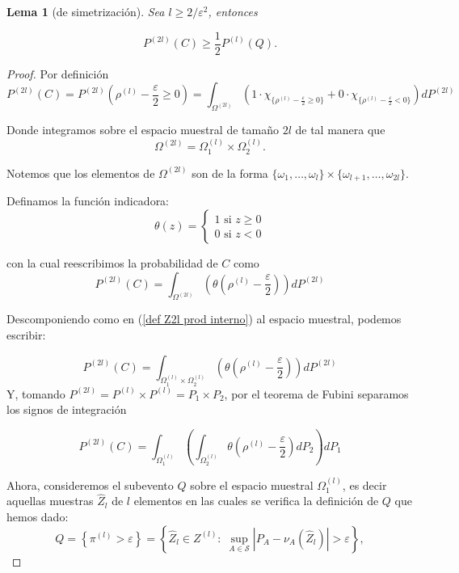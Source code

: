 \documentclass{report}
\newtheorem{lem}{Lema}[section]
\begin{document}
\begin{lem} [de simetrización]
    Sea \( l \geq 2 / \varepsilon^2 \), entonces

    \[
    P^{(2l)}(C) \geq \frac{1}{2} P^{(l)}(Q).
    \]
\end{lem}
\begin{proof}
Por definición
\begin{equation*}
P^{(2l)}(C) = P^{(2l)}\left(\rho^{(l)}-\frac{\varepsilon}{2}\geq 0\right) = \int_{\Omega^{(2l)}} \left( 1 \cdot \chi_{\{\rho^{(l)}-\frac{\varepsilon}{2}\geq 0\}} + 
0 \cdot \chi_{\{\rho^{(l)}-\frac{\varepsilon}{2}< 0\}} \right) dP^{(2l)}
\end{equation*}

Donde integramos sobre el espacio muestral de tamaño $2l$ de tal manera que
\begin{equation}
    \Omega^{(2l)} = \Omega_1^{(l)}\times \Omega_2^{(l)}.  \label{def Z2l prod interno}
\end{equation}

Notemos que los elementos de $\Omega^{(2l)}$ son de la forma $ \{\omega_1,\ldots,\omega_l\} \times \{\omega_{l+1},\dots,\omega_{2l}\}$.\newline

Definamos la función indicadora: 
\[
\theta(z)=\begin{cases}
    1 \text{ si } z\geq 0 \\
    0 \text{ si } z< 0
\end{cases}  
\]

con la cual reescribimos la probabilidad de $C$ como
\begin{equation}
P^{(2l)}(C) = \int_{\Omega^{(2l)}} \left( \theta\left(\rho^{(l)}-\frac{\varepsilon}{2}\right)\right) dP^{(2l)}
\end{equation}

Descomponiendo como en (\ref{def Z2l prod interno}) al espacio muestral, podemos escribir:

\[
P^{(2l)}(C) = \int_{\Omega_1^{(l)}\times \Omega_2^{(l)}} \left( \theta\left(\rho^{(l)}-\frac{\varepsilon}{2}\right)\right) dP^{(2l)}
\]
Y, tomando $P^{(2l)}=P^{(l)}\times P^{(l)} = P_1\times P_2$, por el teorema de Fubini separamos los signos de integración

\[
P^{(2l)}(C) = \int_{\Omega_1^{(l)}} \left( \int_{ \Omega_2^{(l)}}  \theta\left(\rho^{(l)}-\frac{\varepsilon}{2}\right) dP_2\right) dP_1
\]

Ahora, consideremos el subevento $Q$ sobre el espacio muestral $\Omega_1^{(l)}$, es decir aquellas muestras $\hat{Z}_l$ de $l$
elementos en las cuales se verifica la definición de $Q$ que hemos dado:
\[
Q = \left\{ \pi^{(l)} > \varepsilon \right\} = \left\{\hat{Z}_l\in Z^{(l)}:\; 
\sup_{A\in\mathcal{S}}\left|P_A - \nu_A\left(\hat{Z}_l\right)\right| > \varepsilon \right\},
\]


\end{proof}
\end{document}
